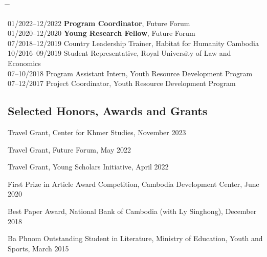 \documentclass[10pt,a4paper]{article}
\newcommand{\tabbedblock}[1]{

	\begin{tabbing}
		\hspace{3cm} \= \hspace{4cm} \= \kill
		#1
	\end{tabbing}
}
\begin{document}
\tabbedblock{
	
	01/2022--12/2022 \> \textbf{Program Coordinator}, Future Forum \\
	
	01/2020--12/2020 \> \textbf{Young Research Fellow}, Future Forum \\

	07/2018--12/2019 \> Country Leadership Trainer, Habitat for Humanity Cambodia\\
		
	10/2016--09/2019 \> Student Representative, Royal University of Law and Economics\\

	07--10/2018 \> Program Assistant Intern, Youth Resource Development Program\\

	07--12/2017 \> Project Coordinator, Youth Resource Development Program\\ 

}

\vspace{-2em}
\subsection*{Selected Honors, Awards and Grants}

\parindent=0pt
	
	Travel Grant, Center for Khmer Studies, November 2023 %
	
	Travel Grant, Future Forum, May 2022 %
	
	Travel Grant, Young Scholars Initiative, April 2022  %
	
	First Prize in Article Award Competition, Cambodia Development Center, June 2020 %
	
	Best Paper Award, National Bank of Cambodia (with Ly Singhong), December 2018 %
	
	Ba Phnom Outstanding Student in Literature, Ministry of Education, Youth and Sports, March 2015


\end{document}
